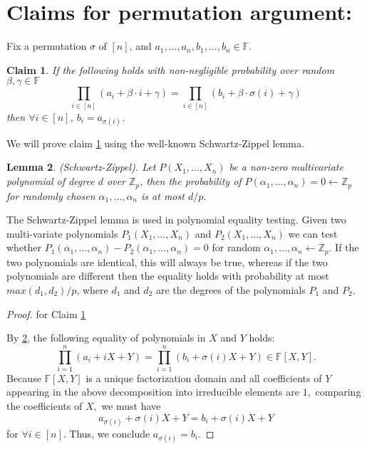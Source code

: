 \documentclass[11pt]{article} %
\newcommand{\F}{\ensuremath{\mathbb F}\xspace}
\newtheorem{lemma}{Lemma}[section]
\newtheorem{claim}[lemma]{Claim}
\begin{document}
\appendix
    
    

\section{Claims for permutation argument:}

Fix a permutation $\sigma$ of $[n]$, and $a_1,\ldots,a_n,b_1,\ldots,b_n \in \F$.
\begin{claim}\label{clm:randpermO}
 If the following holds with non-negligible probability over random $\beta,\gamma \in \F$
 \[\prod_{i\in [n]} (a_i + \beta \cdot i + \gamma) = \prod_{i\in [n]} (b_i+ \beta \cdot \sigma(i) + \gamma)\] 
 then $\forall i \in [n]$, $b_i = a_{\sigma(i)}$.
\end{claim}

We will prove claim \ref{clm:randpermO} using the well-known Schwartz-Zippel lemma.

\begin{lemma}(Schwartz-Zippel)\label{le:SchwartzZippel}. Let $P(X_1, \ldots, X_n)$ be a non-zero multivariate polynomial of degree $d$ over $\mathbb{Z}_p$, then
the probability of $P(\alpha_1, \ldots, \alpha_n)= 0 \leftarrow \mathbb{Z}_p$ for randomly chosen $\alpha_1, \ldots, \alpha_n$ is at most $d/p$.
\end{lemma}

The Schwartz-Zippel lemma is used in polynomial equality testing. Given two multi-variate polynomials $P_1(X_1, \ldots, X_n)$
and $P_2(X_1, \ldots, X_n)$ we can test whether $P_1(\alpha_1, \ldots, \alpha_n) -  P_2(\alpha_1, \ldots, \alpha_n)  = 0$ for random $\alpha_1, \ldots, \alpha_n  \leftarrow \mathbb{Z}_p$.
If the two polynomials are identical, this will always be true, whereas if the two polynomials are different then the equality holds with probability at most $max(d_1, d_2)/p$, where $d_1$ and 
$d_2$ are the degrees of the polynomials $P_1$ and $P_2$. 



\begin{proof} for Claim \ref{clm:randpermO}

By \ref{le:SchwartzZippel}, the following equality of polynomials in $X$ and $Y$ holds:
\[\prod_{i=1}^n(a_i+iX +Y) = \prod_{i=1}^n(b_i+\sigma(i)X +Y)\in\mathbb F[X,Y].\]
Because $\mathbb F[X,Y]$ is a unique factorization domain and all coefficients of $Y$ appearing in the above decomposition into irreducible elements are $1,$ comparing the coefficients of $X,$ we must have
\[a_{\sigma(i)}+\sigma(i)X +Y = b_i+\sigma(i)X +Y\]
for $\forall i \in [n].$ Thus, we conclude $a_{\sigma(i)} = b_i.$
\end{proof}
\end{document}
